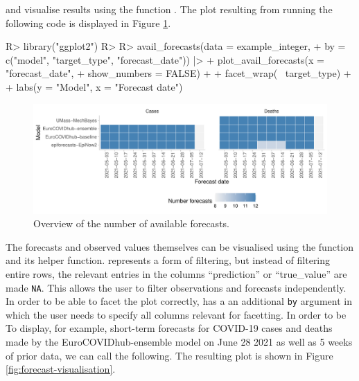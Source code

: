 \documentclass[
]{jss}
\begin{document}
and visualise results using the function
. The plot resulting from running the
following code is displayed in Figure \ref{fig:avail-forecasts-plot}.

\begin{CodeChunk}
\begin{CodeInput}
R> library("ggplot2")
R>
R> avail_forecasts(data = example_integer,
+                 by = c("model", "target_type", "forecast_date")) |>
+   plot_avail_forecasts(x = "forecast_date",
+                        show_numbers = FALSE) +
+   facet_wrap(~ target_type) +
+   labs(y = "Model", x = "Forecast date")
\end{CodeInput}
\begin{figure}[!h]

{\centering \includegraphics[width=1\linewidth]{manuscript_files/figure-latex/avail-forecasts-plot-1}

}

\caption[Overview of the number of available forecasts]{Overview of the number of available forecasts.}\label{fig:avail-forecasts-plot}
\end{figure}
\end{CodeChunk}

\nocite{ggplot2}

The forecasts and observed values themselves can be visualised using the
 function and its  helper
function.  represents a form of filtering, but instead
of filtering entire rows, the relevant entries in the columns
``prediction'' or ``true\_value'' are made \texttt{NA}. This allows the
user to filter observations and forecasts independently. In order to be
able to facet the plot correctly,  has a an
additional \texttt{by} argument in which the user needs to specify all
columns relevant for facetting. In order to be To display, for example,
short-term forecasts for COVID-19 cases and deaths made by the
EuroCOVIDhub-ensemble model on June 28 2021 as well as 5 weeks of prior
data, we can call the following. The resulting plot is shown in Figure
\ref{fig:forecast-visualisation}.
\end{document}
